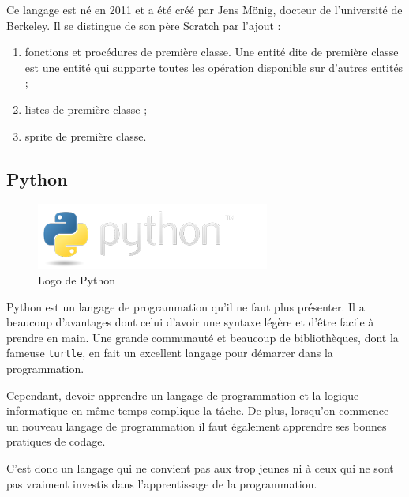 Ce langage est né en 2011 et a été créé par Jens Mönig, docteur de l'université de Berkeley. Il se distingue de son père Scratch par l'ajout :
\begin{enumerate}
\item fonctions et procédures de première classe. Une entité dite de première classe est une entité qui supporte toutes les opération disponible sur d'autres entités ; %
\item listes de première classe ;
\item \gls{sprite} de première classe.
\end{enumerate}

\subsection{Python}

\begin{figure}[!ht]
  \begin{center}
    \includegraphics[scale=0.4]{content/5-related_work/images/python}
    \caption{Logo de Python}
    \label{fig:python}
  \end{center}
\end{figure}

Python \cite{python} est un langage de programmation qu'il ne faut plus présenter. Il a beaucoup d'avantages dont celui d'avoir une syntaxe légère et d'être facile à prendre en main. Une grande communauté et beaucoup de bibliothèques, dont la fameuse \texttt{turtle}, en fait un excellent langage pour démarrer dans la programmation.

Cependant, devoir apprendre un langage de programmation et la logique informatique en même temps complique la tâche. De plus, lorsqu'on commence un nouveau langage de programmation il faut également apprendre ses bonnes pratiques de codage. %

C'est donc un langage qui ne convient pas aux trop jeunes ni à ceux qui ne sont pas vraiment investis dans l'apprentissage de la programmation.
